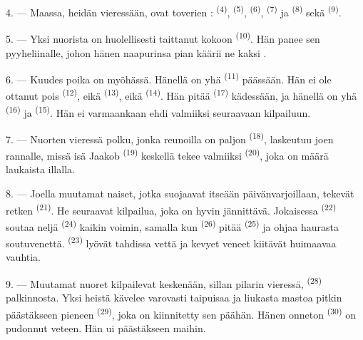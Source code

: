4. --- Maassa, heidän vieressään, ovat toverien : 
 \textsuperscript{(4)}, 
\textsuperscript{(5)},  \textsuperscript{(6)},
 \textsuperscript{(7)} ja 
\textsuperscript{(8)} sekä  \textsuperscript{(9)}.

5. --- Yksi nuorista on huolellisesti taittanut kokoon 
\textsuperscript{(10)}. Hän panee sen pyyheliinalle, johon hänen naapurinsa pian
käärii ne kaksi .

6. --- Kuudes poika on myöhässä. Hänellä on yhä 
\textsuperscript{(11)} päässään. Hän ei ole ottanut pois 
\textsuperscript{(12)}, eikä  \textsuperscript{(13)}, eikä
 \textsuperscript{(14)}. Hän pitää 
\textsuperscript{(17)} kädessään, ja hänellä on yhä 
\textsuperscript{(16)} ja  \textsuperscript{(15)}. Hän ei
varmaankaan ehdi valmiiksi seuraavaan kilpailuun.

7. --- Nuorten vieressä polku, jonka reunoilla on paljon 
\textsuperscript{(18)}, laskeutuu joen rannalle, missä isä Jaakob
 \textsuperscript{(19)} keskellä tekee valmiiksi
 \textsuperscript{(20)}, joka on määrä laukaista illalla.

\VUsaut{4.4mm}
\VUsaut{3.4mm}

8. --- Joella muutamat naiset, jotka suojaavat itseään päivänvarjoillaan,
tekevät retken  \textsuperscript{(21)}. He seuraavat kilpailua,
joka on hyvin jännittävä. Jokaisessa  \textsuperscript{(22)}
soutaa neljä  \textsuperscript{(24)} kaikin voimin, samalla kun
 \textsuperscript{(26)} pitää 
\textsuperscript{(25)} ja ohjaa haurasta soutuvenettä. 
\textsuperscript{(23)} lyövät tahdissa vettä ja kevyet veneet kiitävät
huimaavaa vauhtia.

9. --- Muutamat nuoret kilpailevat keskenään, sillan pilarin vieressä,
 \textsuperscript{(28)} palkinnosta. Yksi heistä kävelee
varovasti taipuisaa ja liukasta mastoa pitkin päästäkseen pieneen
 \textsuperscript{(29)}, joka on kiinnitetty sen päähän. Hänen
onneton  \textsuperscript{(30)} on pudonnut veteen. Hän
ui päästäkseen maihin.

